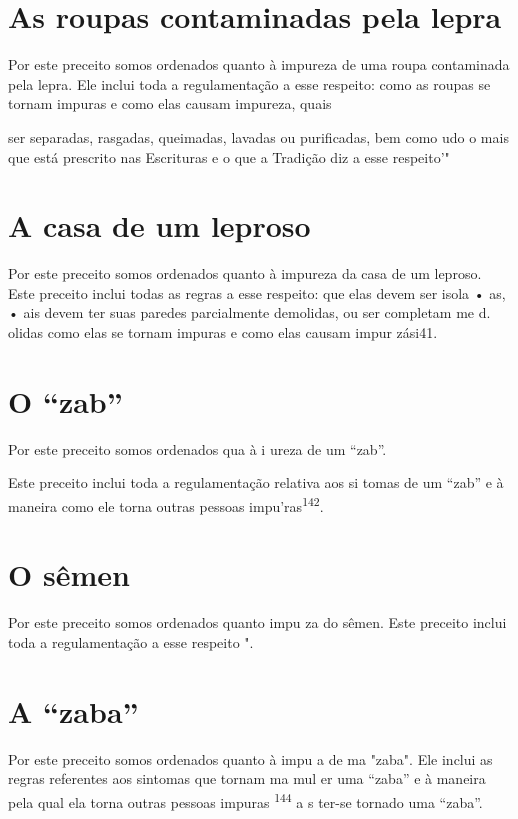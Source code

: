 \section{As roupas contaminadas pela lepra}

Por este preceito somos ordenados quanto à impureza de uma rou­pa
contaminada pela lepra. Ele inclui toda a regulamentação a esse
respeito: co­mo as roupas se tornam impuras e como elas causam impureza,
quais

ser separadas, rasgadas, queimadas, lavadas ou purificadas, bem como udo
o mais que está prescrito nas Escrituras e o que a Tradição diz a esse
respeito'"

\section{A casa de um leproso}

Por este preceito somos ordenados quanto à impureza da casa de um
leproso. Este preceito inclui todas as regras a esse respeito: que elas
devem ser isola • as, • ais devem ter suas paredes parcialmente
demolidas, ou ser com­pletam me d. olidas como elas se
tornam impuras e como elas causam impur zási41.

\section{O ``zab''}

Por este preceito somos ordenados qua à i ureza de um ``zab''.

Este preceito inclui toda a regulamentação relativa aos si tomas de um
``zab'' e à maneira como ele torna outras pessoas
impu'ras\textsuperscript{142}.

\section{O sêmen}

Por este preceito somos ordenados quanto impu za do sêmen. Este preceito
inclui toda a regulamentação a esse respeito ".

\section{A ``zaba''}

Por este preceito somos ordenados quanto à impu a de ma "za­ba". Ele
inclui as regras referentes aos sintomas que tornam ma mul er uma ``zaba''
e à maneira pela qual ela torna outras pessoas impuras
\textsuperscript{144} a s ter-se tornado uma ``zaba''.

